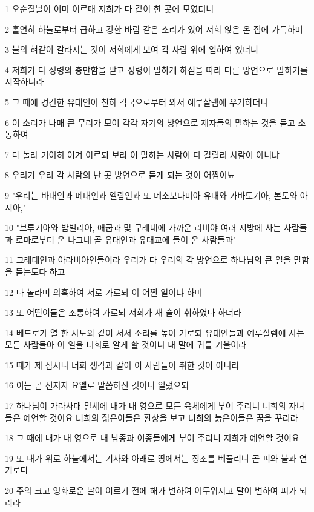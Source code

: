 \par 1 오순절날이 이미 이르매 저희가 다 같이 한 곳에 모였더니
\par 2 홀연히 하늘로부터 급하고 강한 바람 같은 소리가 있어 저희 앉은 온 집에 가득하며
\par 3 불의 혀같이 갈라지는 것이 저희에게 보여 각 사람 위에 임하여 있더니
\par 4 저희가 다 성령의 충만함을 받고 성령이 말하게 하심을 따라 다른 방언으로 말하기를 시작하니라
\par 5 그 때에 경건한 유대인이 천하 각국으로부터 와서 예루살렘에 우거하더니
\par 6 이 소리가 나매 큰 무리가 모여 각각 자기의 방언으로 제자들의 말하는 것을 듣고 소동하여
\par 7 다 놀라 기이히 여겨 이르되 보라 이 말하는 사람이 다 갈릴리 사람이 아니냐
\par 8 우리가 우리 각 사람의 난 곳 방언으로 듣게 되는 것이 어찜이뇨
\par 9 "우리는 바대인과 메대인과 엘람인과 또 메소보다미아 유대와 가바도기아, 본도와 아시아,"
\par 10 "브루기아와 밤빌리아, 애굽과 및 구레네에 가까운 리비야 여러 지방에 사는 사람들과 로마로부터 온 나그네 곧 유대인과 유대교에 들어 온 사람들과"
\par 11 그레데인과 아라비아인들이라 우리가 다 우리의 각 방언으로 하나님의 큰 일을 말함을 듣는도다 하고
\par 12 다 놀라며 의혹하여 서로 가로되 이 어찐 일이냐 하며
\par 13 또 어떤이들은 조롱하여 가로되 저희가 새 술이 취하였다 하더라
\par 14 베드로가 열 한 사도와 같이 서서 소리를 높여 가로되 유대인들과 예루살렘에 사는 모든 사람들아 이 일을 너희로 알게 할 것이니 내 말에 귀를 기울이라
\par 15 때가 제 삼시니 너희 생각과 같이 이 사람들이 취한 것이 아니라
\par 16 이는 곧 선지자 요엘로 말씀하신 것이니 일렀으되
\par 17 하나님이 가라사대 말세에 내가 내 영으로 모든 육체에게 부어 주리니 너희의 자녀들은 예언할 것이요 너희의 젊은이들은 환상을 보고 너희의 늙은이들은 꿈을 꾸리라
\par 18 그 때에 내가 내 영으로 내 남종과 여종들에게 부어 주리니 저희가 예언할 것이요
\par 19 또 내가 위로 하늘에서는 기사와 아래로 땅에서는 징조를 베풀리니 곧 피와 불과 연기로다
\par 20 주의 크고 영화로운 날이 이르기 전에 해가 변하여 어두워지고 달이 변하여 피가 되리라
